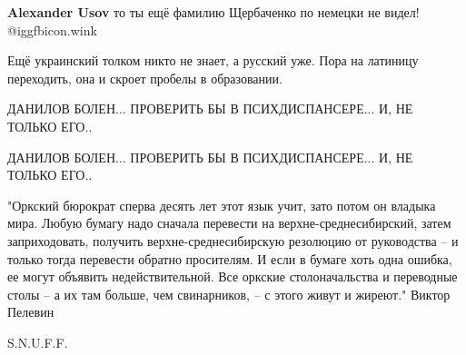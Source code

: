 \begin{itemize}
\begin{itemize}
\textbf{Alexander Usov} то ты ещё фамилию Щербаченко по немецки не видел!  @igg{fbicon.wink} 
\end{itemize} %

 
Ещё украинский толком никто не знает, а русский уже. Пора на латиницу переходить, она и скроет пробелы в образовании.

 
ДАНИЛОВ БОЛЕН... ПРОВЕРИТЬ БЫ В ПСИХДИСПАНСЕРЕ... И, НЕ ТОЛЬКО ЕГО..

 
ДАНИЛОВ БОЛЕН... ПРОВЕРИТЬ БЫ В ПСИХДИСПАНСЕРЕ... И, НЕ ТОЛЬКО ЕГО..

 

"Оркский бюрократ сперва десять лет этот язык учит, зато потом он владыка мира.
Любую бумагу надо сначала перевести на верхне-среднесибирский, затем
заприходовать, получить верхне-среднесибирскую резолюцию от руководства – и
только тогда перевести обратно просителям. И если в бумаге хоть одна ошибка, ее
могут объявить недействительной. Все оркские столоначальства и переводные столы
– а их там больше, чем свинарников, – с этого живут и жиреют." Виктор Пелевин

S.N.U.F.F.

\end{itemize} %

